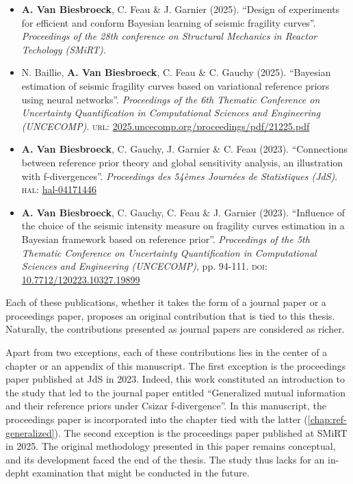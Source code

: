 \begin{itemize}
    \item \textbf{A. Van Biesbroeck}, C. Feau \& J. Garnier (2025). ``Design of experiments for efficient and conform Bayesian learning of seismic fragility curves''. \emph{Proceedings of the 28th conference on Structural Mechanics in Reactor Techology (SMiRT).}
    \item N. Baillie, \textbf{A. Van Biesbroeck}, C. Feau \& C. Gauchy (2025). ``Bayesian estimation of seismic fragility curves based on variational reference priors using neural networks''. \emph{Proceedings of the 6th Thematic Conference on Uncertainty Quantification in Computational Sciences and Engineering (UNCECOMP)}. \textsc{url:} \href{https://2025.uncecomp.org/proceedings/pdf/21225.pdf}{2025.uncecomp.org/proceedings/pdf/21225.pdf}
    \item \textbf{A. Van Biesbroeck}, C. Gauchy, J. Garnier \& C. Feau (2023). ``Connections between reference prior theory and global sensitivity analysis, an illustration with f-divergences''. \emph{Proceedings des 54èmes Journées de Statistiques (JdS)}. \textsc{hal:} \href{https://hal.science/hal-04171446}{hal-04171446}
    \item \textbf{A. Van Biesbroeck}, C. Gauchy, C. Feau \& J. Garnier (2023). ``Influence of the choice of the seismic intensity measure on fragility curves estimation in a Bayesian framework based on reference prior''. \emph{Proceedings of the 5th Thematic Conference on Uncertainty Quantification in Computational Sciences and Engineering (UNCECOMP)}, pp. 94-111. \textsc{doi:} \href{https://dx.doi.org/10.7712/120223.10327.19899}{10.7712/120223.10327.19899}
\end{itemize}




Each of these publications, whether it takes the form of a journal paper or a proceedings paper, proposes an original contribution that is tied to this thesis.
Naturally, the contributions presented as journal papers are considered as richer.

Apart from two exceptions, each of these contributions lies in the center of a chapter or an appendix of this manuscript.
The first exception is the proceedings paper published at JdS in 2023. Indeed, this work constituted an introduction to the study that led to the journal paper entitled ``Generalized mutual information and their reference priors under Csizar f-divergence''. In this manuscript, the proceedings paper is incorporated into the chapter tied with the latter (\cref{chap:ref-generalized}). The second exception is the proceedings paper published at SMiRT in 2025. The original methodology presented in this paper remains conceptual, and its development faced the end of  the thesis.
The study thus lacks for an in-depht examination that might be conducted in the future.
\newpage
\thispagestyle{plain}





